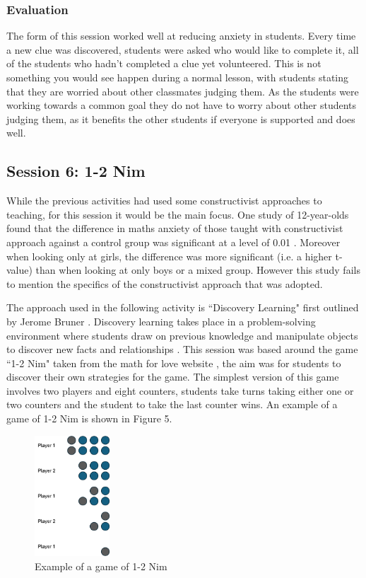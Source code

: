 \documentclass[11pt, a4paper, notitlepage]{article}
\begin{document}
\subsubsection*{Evaluation} 
The form of this session worked well at reducing anxiety in students. Every time a new clue was discovered, students were asked who would like to complete it, all of the students who hadn't completed a clue yet volunteered. This is not something you would see happen during a normal lesson, with students stating that they are worried about other classmates judging them. As the students were working towards a common goal they do not have to worry about other students judging them, as it benefits the other students if everyone is supported and does well.

\subsection{Session 6: 1-2 Nim}
While the previous activities had used some constructivist approaches to teaching, for this session it would be the main focus. One study of 12-year-olds found that the difference in maths anxiety of those taught with constructivist approach against a control group was significant at a level of 0.01 \cite{Suman:2021}. Moreover when looking only at girls, the difference was more significant (i.e. a higher t-value) than when looking at only boys or a mixed group. However this study fails to mention the specifics of the constructivist approach that was adopted. 
\par
The approach used in the following activity is ``Discovery Learning" first outlined by Jerome Bruner \cite{Bruner:1961}. Discovery learning takes place in a problem-solving environment where students draw on previous knowledge and manipulate objects to discover new facts and relationships \cite{learning-theories:Discovery-learning}. This session was based around the game ``1-2 Nim" taken from the math for love website \cite{1-2Nim}, the aim was for students to discover their own strategies for the game. The simplest version of this game involves two players and eight counters, students take turns taking either one or two counters and the student to take the last counter wins. An example of a game of 1-2 Nim is shown in Figure 5.
\par
\begin{figure}[htbp]
    \centering
    \includegraphics[width=0.25\textwidth]{Images/1-2Nim_example.png}
    \caption{Example of a game of 1-2 Nim}
    \end{figure}
\end{document}
